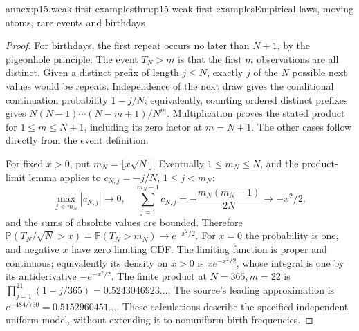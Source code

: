 \begin{annexitem}{annex:p15.weak-first-examples}{thm:p15-weak-first-examples}{Empirical laws, moving atoms, rare events and birthdays}
\begin{proof}
For birthdays, the first repeat occurs no later than \(N+1\),
by the pigeonhole principle. The event \(T_N>m\) is that the
first \(m\) observations are all distinct.
Given a distinct prefix of length \(j\leq N\), exactly \(j\)
of the \(N\) possible next values would be repeats.
Independence of the next draw gives the conditional
continuation probability \(1-j/N\); equivalently, counting
ordered distinct prefixes gives \(N(N-1)\cdots(N-m+1)/N^m\).
Multiplication proves the stated product for \(1\leq m\leq N+1\),
including its zero factor at \(m=N+1\). The other cases
follow directly from the event definition.

For fixed \(x>0\), put \(m_N=\lfloor x\sqrt N\rfloor\).
Eventually \(1\leq m_N\leq N\), and the product-limit
lemma applies to \(c_{N,j}=-j/N\), \(1\leq j<m_N\):
\[
 \max_{j<m_N}|c_{N,j}|\to0,\quad
 \sum_{j=1}^{m_N-1}c_{N,j}
       =-\frac{m_N(m_N-1)}{2N}\longrightarrow-x^2/2,
\]
and the sums of absolute values are bounded.
Therefore
\(\mathbb P(T_N/\sqrt N>x)=\mathbb P(T_N>m_N)\to e^{-x^2/2}\).
For \(x=0\) the probability is one, and negative \(x\)
have zero limiting CDF. The limiting function is proper
and continuous; equivalently its density on \(x>0\) is
\(xe^{-x^2/2}\), whose integral is one by its antiderivative
\(-e^{-x^2/2}\).
The finite product at \(N=365,m=22\) is
\(\prod_{j=1}^{21}(1-j/365)=0.5243046923\ldots\).
The source's leading approximation is
\(e^{-484/730}=0.5152960451\ldots\).
These calculations describe the specified independent uniform
model, without extending it to nonuniform birth frequencies.
\end{proof}
\end{annexitem}

